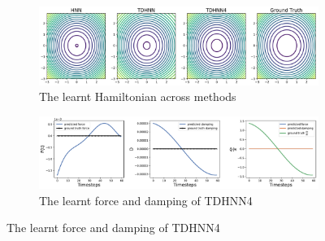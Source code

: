 \documentclass[twoside]{article}
\begin{document}
\begin{figure}[!htb]
\begin{subfigure}[b]{0.48\textwidth}
\includegraphics[width=\textwidth]{figures/figures/mass_spring/1/mass_spring_hamiltonian_0.pdf}
\caption{The learnt Hamiltonian across methods}
\end{subfigure}
\begin{subfigure}[b]{0.48\textwidth}
\includegraphics[width=\textwidth]{figures/figures/mass_spring/1/mass_spring_dpdt_0.pdf}
\caption{The learnt force and damping of TDHNN4}
\end{subfigure}
\label{mspring_full}
\end{figure}
\end{document}
